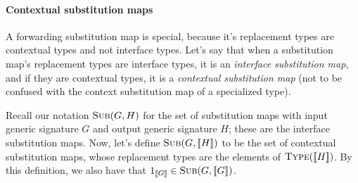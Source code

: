 \documentclass[../generics]{subfiles}
\begin{document}
\paragraph{Contextual substitution maps} A forwarding substitution map is special, because it's replacement types are contextual types and not interface types. Let's say that when a substitution map's replacement types are interface types, it is an \emph{interface substitution map}, and if they are contextual types, it is a \emph{contextual substitution map} (not to be confused with the context substitution map of a specialized type).

Recall our notation $\textsc{Sub}({G, H})$ for the set of substitution maps with input generic signature $G$ and output generic signature $H$; these are the interface substitution maps. Now, let's define $\textsc{Sub}({G, [\![H]\!]})$ to be the set of contextual substitution maps, whose replacement types are the elements of  $\textsc{Type}({[\![H]\!]})$. By this definition, we also have that $1_{[\![G]\!]}\in\textsc{Sub}({G, [\![G]\!]})$.
\end{document}
